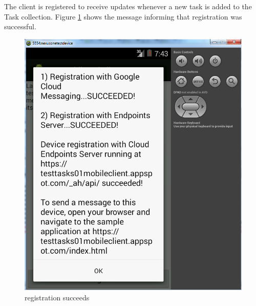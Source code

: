 \pagebreak
The client is registered to receive updates whenever a new task is added to the Task collection. Figure \ref{mobile_registration_figure} shows the message informing that registration was successful.\\
\begin{figure}[H]
	\centering
	\includegraphics[scale=0.7]{images/googlemessagin_isonline_cloudmessaging.png}
	\caption{registration succeeds}
	\label{mobile_registration_figure}
\end{figure}

